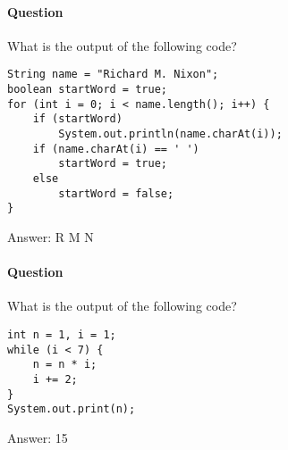 \documentclass{article}
\begin{document}
\addtocounter{question_num}{1}
\paragraph{Question }
What is the output of the following code?
\begin{lstlisting}
String name = "Richard M. Nixon";
boolean startWord = true;
for (int i = 0; i < name.length(); i++) {
	if (startWord)
		System.out.println(name.charAt(i));
	if (name.charAt(i) == ' ')
		startWord = true;
	else
		startWord = false;
}
\end{lstlisting}
{\color{red}Answer: 
\newline R
\newline M
\newline N}

\addtocounter{question_num}{1}
\paragraph{Question }
What is the output of the following code?
\begin{lstlisting}
int n = 1, i = 1;
while (i < 7) {
	n = n * i;
	i += 2;
}
System.out.print(n);
\end{lstlisting}
{\color{red}Answer: 15}
\end{document}
